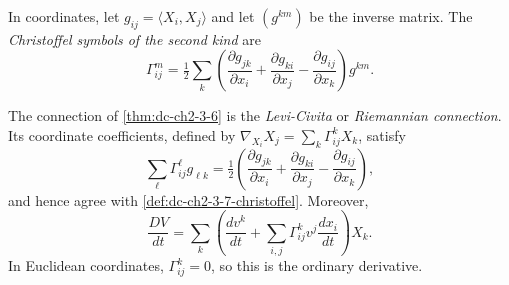 \begin{definition}
  \label{def:dc-ch2-3-7-christoffel}
  \leanok
  In coordinates, let $g_{ij}=\langle X_i,X_j\rangle$ and let $(g^{km})$ be
  the inverse matrix. The \emph{Christoffel symbols of the second kind} are
  \[
    \Gamma_{ij}^m
      =\tfrac12\sum_k\left(
        \frac{\partial g_{jk}}{\partial x_i}
       +\frac{\partial g_{ki}}{\partial x_j}
       -\frac{\partial g_{ij}}{\partial x_k}\right)g^{km}.\tag{10}
  \]
\end{definition}

\begin{remark}
  \label{rem:dc-ch2-3-7}
  \leanok
  The connection of \cref{thm:dc-ch2-3-6} is the \emph{Levi-Civita} or
  \emph{Riemannian connection}. Its coordinate coefficients, defined by
  $\nabla_{X_i}X_j=\sum_k\Gamma_{ij}^kX_k$, satisfy
  \[
    \sum_\ell\Gamma_{ij}^\ell g_{\ell k}
      =\tfrac12\left(
        \frac{\partial g_{jk}}{\partial x_i}
       +\frac{\partial g_{ki}}{\partial x_j}
       -\frac{\partial g_{ij}}{\partial x_k}\right),
  \]
  and hence agree with \cref{def:dc-ch2-3-7-christoffel}. Moreover,
  \[
    \frac{DV}{dt}
      =\sum_k\left(\frac{dv^k}{dt}
        +\sum_{i,j}\Gamma_{ij}^kv^j\frac{dx_i}{dt}\right)X_k.
  \]
  In Euclidean coordinates, $\Gamma_{ij}^k=0$, so this is the ordinary
  derivative.
\end{remark}

